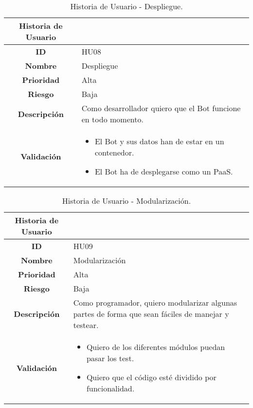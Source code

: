 \begin{table}[H]
	\begin{center}
		\begin{tabular}{| c | p{9cm} |}
			\hline
			
			Historia de Usuario &  \\ \hline
			
			
			\textbf{ID} & HU08 \\
			\textbf{Nombre} & Despliegue \\
			\textbf{Prioridad} & Alta \\
			\textbf{Riesgo} & Baja \\
			\textbf{Descripción} & Como desarrollador quiero que el Bot funcione en todo momento. \\
			\textbf{Validación} & \begin{itemize}
				\item El Bot y sus datos han de estar en un contenedor.
				\item El Bot ha de desplegarse como un PaaS.
			\end{itemize} \\ \hline
		\end{tabular}
		\caption{Historia de Usuario - Despliegue.}
	\end{center}
\end{table}

\begin{table}[H]
	\begin{center}
		\begin{tabular}{| c | p{9cm} |}
			\hline
			
			Historia de Usuario &  \\ \hline
			
			
			\textbf{ID} & HU09 \\
			\textbf{Nombre} & Modularización \\
			\textbf{Prioridad} & Alta \\
			\textbf{Riesgo} & Baja \\
			\textbf{Descripción} & Como programador, quiero modularizar algunas partes de forma que sean fáciles de manejar y testear. \\
			\textbf{Validación} & \begin{itemize}
				\item Quiero de los diferentes módulos puedan pasar los test.
				\item Quiero que el código esté dividido por funcionalidad.
			\end{itemize} \\ \hline
		\end{tabular}
		\caption{Historia de Usuario - Modularización.}
	\end{center}
\end{table}

